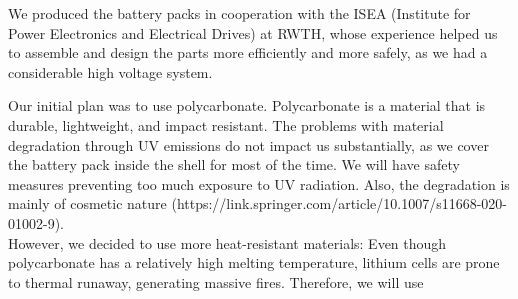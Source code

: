 We produced the battery packs in cooperation with the ISEA (Institute for Power Electronics and Electrical Drives) at RWTH, whose experience helped us to assemble and design the parts more efficiently and more safely, as we had a considerable high voltage system.

Our initial plan was to use polycarbonate. Polycarbonate is a material that is durable, lightweight, and impact resistant. The problems with material degradation through UV emissions do not impact us substantially, as we cover the battery pack inside the shell for most of the time. We will have safety measures preventing too much exposure to UV radiation. Also, the degradation is mainly of cosmetic nature (https://link.springer.com/article/10.1007/s11668-020-01002-9). \\
However, we decided to use more heat-resistant materials: Even though polycarbonate has a relatively high melting temperature, lithium cells are prone to thermal runaway, generating massive fires. Therefore, we will use

